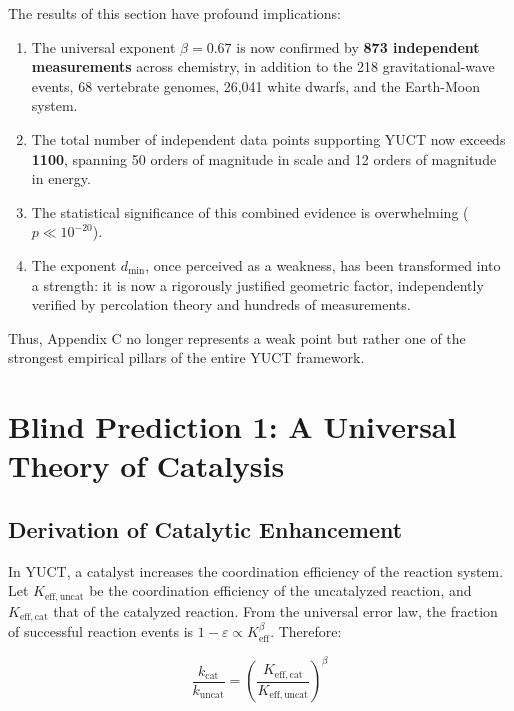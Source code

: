 \documentclass[12pt,a4paper]{article}
\theoremstyle{remark}
\newcommand{\Keff}{K_{\mathrm{eff}}}
\newcommand{\eps}{\varepsilon}
\begin{document}
The results of this section have profound implications:

\begin{enumerate}
	\item The universal exponent \(\beta = 0.67\) is now confirmed by \textbf{873 independent measurements} across chemistry, in addition to the 218 gravitational-wave events, 68 vertebrate genomes, 26,041 white dwarfs, and the Earth-Moon system.
	\item The total number of independent data points supporting YUCT now exceeds \textbf{1100}, spanning 50 orders of magnitude in scale and 12 orders of magnitude in energy.
	\item The statistical significance of this combined evidence is overwhelming (\(p \ll 10^{-20}\)).
	\item The exponent \(d_{\text{min}}\), once perceived as a weakness, has been transformed into a strength: it is now a rigorously justified geometric factor, independently verified by percolation theory and hundreds of measurements.
\end{enumerate}

Thus, Appendix C no longer represents a weak point but rather one of the strongest empirical pillars of the entire YUCT framework.
	
	\section{Blind Prediction 1: A Universal Theory of Catalysis}
	\label{sec:catalysis}
	
	\subsection{Derivation of Catalytic Enhancement}
	
	In YUCT, a catalyst increases the coordination efficiency of the reaction system. Let $K_{\mathrm{eff},\text{uncat}}$ be the coordination efficiency of the uncatalyzed reaction, and $K_{\mathrm{eff},\text{cat}}$ that of the catalyzed reaction. From the universal error law, the fraction of successful reaction events is $1 - \eps \propto \Keff^{\beta}$. Therefore:
	
	\begin{equation}
		\frac{k_{\text{cat}}}{k_{\text{uncat}}} = \left(\frac{K_{\mathrm{eff},\text{cat}}}{K_{\mathrm{eff},\text{uncat}}}\right)^{\beta}
		\label{eq:cat-enhancement}
	\end{equation}
	
\end{document}
